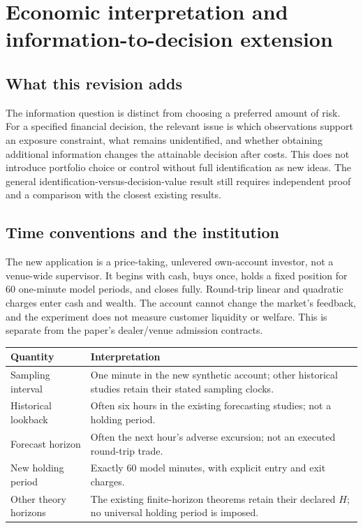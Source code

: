\section*{Economic interpretation and information-to-decision extension}

\subsection*{What this revision adds}
The information question is distinct from choosing a preferred amount of risk.
For a specified financial decision, the relevant issue is which observations
support an exposure constraint, what remains unidentified, and whether obtaining
additional information changes the attainable decision after costs. This does
not introduce portfolio choice or control without full identification as new
ideas. The general identification-versus-decision-value result still requires
independent proof and a comparison with the closest existing results.

\subsection*{Time conventions and the institution}
The new application is a price-taking, unlevered own-account investor, not a
venue-wide supervisor. It begins with cash, buys once, holds a fixed position
for 60 one-minute model periods, and closes fully. Round-trip linear and
quadratic charges enter cash and wealth. The account cannot change the market's
feedback, and the experiment does not measure customer liquidity or welfare.
This is separate from the paper's dealer/venue admission contracts.

\begin{center}\small
\begin{tabular}{p{}p{}}
\toprule
Quantity & Interpretation\\
\midrule
Sampling interval & One minute in the new synthetic account; other historical studies retain their stated sampling clocks.\\
Historical lookback & Often six hours in the existing forecasting studies; not a holding period.\\
Forecast horizon & Often the next hour's adverse excursion; not an executed round-trip trade.\\
New holding period & Exactly 60 model minutes, with explicit entry and exit charges.\\
Other theory horizons & The existing finite-horizon theorems retain their declared $H$; no universal holding period is imposed.\\
\bottomrule
\end{tabular}
\end{center}


